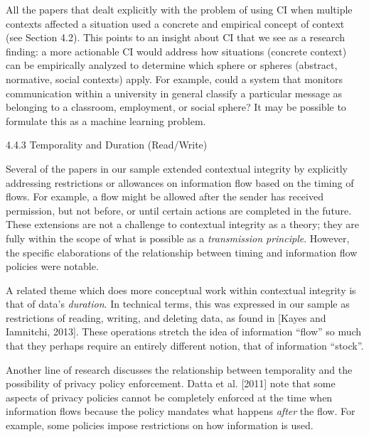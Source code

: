 \documentclass[../thesis.tex]{subfiles}
\begin{document}
\bigskip

All the papers that dealt explicitly with the problem of using CI when
multiple contexts affected a situation used a concrete and empirical
concept of context (see Section 4.2)\textcolor[rgb]{0.2,0.2,0.2}{.
}This points to an insight about CI that we see as a research finding:
a more actionable CI would address how situations (concrete context)
can be empirically analyzed to determine which sphere or spheres
(abstract, normative, social contexts) apply. For example, could a
system that monitors communication within a university in general
classify a particular message as belonging to a classroom, employment,
or social sphere? It may be possible to formulate this as a machine
learning problem.


\bigskip

{\color[rgb]{0.4,0.4,0.4}
4.4.3 Temporality and Duration (Read/Write)}


\bigskip

Several of the papers in our sample extended contextual integrity by
explicitly addressing restrictions or allowances on information flow
based on the timing of flows. For example, a flow might be allowed
after the sender has received permission, but not before, or until
certain actions are completed in the future. These extensions are not a
challenge to contextual integrity as a theory; they are fully within
the scope of what is possible as a \textit{transmission principle}.
However, the specific elaborations of the relationship between timing
and information flow policies were notable.


\bigskip

A related theme which does more conceptual work within contextual
integrity is that of data's \textit{duration}. In
technical terms, this was expressed in our sample as restrictions of
reading, writing, and deleting data, as found in [Kayes and Iamnitchi,
2013]. These operations stretch the idea of information
``flow'' so much that they perhaps
require an entirely different notion, that of information
``stock''.


\bigskip

Another line of research discusses the relationship between temporality
and the possibility of privacy policy enforcement. Datta et al. [2011]
note that some aspects of privacy policies cannot be completely
enforced at the time when information flows because the policy mandates
what happens \textit{after} the flow. For example, some policies impose
restrictions on how information is used.
\end{document}
